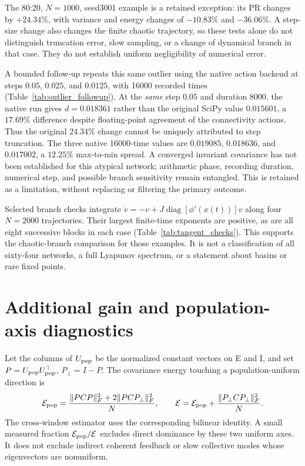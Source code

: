 \documentclass[11pt]{article}
\newcommand{\diag}{\operatorname{diag}}
\newcommand{\energy}{\mathcal E}
\begin{document}
The 80:20, $N=1000$, seed3001 example is a retained exception: its PR
changes by $+24.34\%$, with variance and energy changes of $-10.83\%$ and
$-36.06\%$. A step-size change also changes the finite chaotic trajectory,
so these tests alone do not distinguish truncation error, slow sampling,
or a change of dynamical branch in that case. They do not establish uniform
negligibility of numerical error.



A bounded follow-up repeats this same outlier using the native action
backend at steps $0.05$, $0.025$, and $0.0125$, with 16000 recorded times
(Table~\ref{tab:outlier_followup}). At the \emph{same} step $0.05$ and
duration 8000, the native run gives $d=0.018361$ rather than the original
SciPy value $0.015601$, a $17.69\%$ difference despite floating-point
agreement of the connectivity actions. Thus the original $24.34\%$ change
cannot be uniquely attributed to step truncation.
The three native 16000-time values are $0.019085$, $0.018636$, and
$0.017002$, a $12.25\%$ max-to-min spread. A converged invariant covariance
has not been established for this atypical network; arithmetic phase,
recording duration, numerical step, and possible branch sensitivity remain
entangled. This is retained as a limitation, without replacing or filtering
the primary outcome.



Selected branch checks integrate
$\dot v=-v+J\diag[\phi'(x(t))]v$ along four $N=2000$ trajectories.
Their largest finite-time exponents are positive, as are all eight
successive blocks in each case (Table~\ref{tab:tangent_checks}). This
supports the chaotic-branch comparison for those examples. It is not a
classification of all sixty-four networks, a full Lyapunov spectrum, or
a statement about basins or rare fixed points.



\FloatBarrier





\section{Additional gain and population-axis diagnostics}
\label{app:ingredients}

Let the columns of $U_{\rm pop}$ be the normalized constant vectors on E and
I, and set $P=U_{\rm pop}U_{\rm pop}^{\top}$, $P_\perp=I-P$.
The covariance energy touching a population-uniform direction is
\begin{equation}
 \energy_{\rm pop}=\frac{\|PCP\|_F^2+2\|PCP_\perp\|_F^2}{N},\qquad
 \energy=\energy_{\rm pop}+\frac{\|P_\perp CP_\perp\|_F^2}{N}.
\end{equation}
The cross-window estimator uses the corresponding bilinear identity.
A small measured fraction $\energy_{\rm pop}/\energy$ excludes direct
dominance by these two uniform axes. It does not exclude indirect coherent
feedback or slow collective modes whose eigenvectors are nonuniform.
\end{document}
